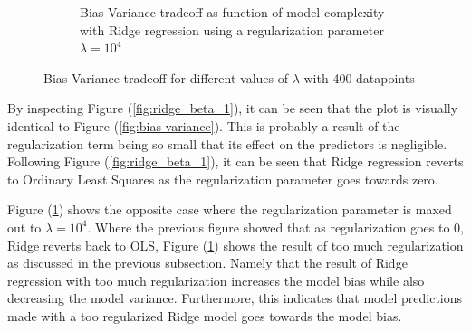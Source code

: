 \documentclass[11pt, a4paper]{article}
\begin{document}
\begin{figure}
\begin{subfigure}{0.49\textwidth}
      \caption{\label{fig:ridge_beta_2}Bias-Variance tradeoff as function of model complexity with Ridge regression using a regularization parameter $\lambda = 10^{4}$}
  \end{subfigure}
  \caption{\label{sfig:ridge_beta_1}Bias-Variance tradeoff for different values of $\lambda$ with 400 datapoints}
\end{figure}

By inspecting Figure (\ref{fig:ridge_beta_1}), it can be seen that the plot is visually identical to Figure (\ref{fig:bias-variance}). This is probably a result of the regularization term being so small that its effect on the predictors is negligible. Following Figure (\ref{fig:ridge_beta_1}), it can be seen that Ridge regression reverts to Ordinary Least Squares as the regularization parameter goes towards zero.

Figure (\ref{fig:ridge_beta_2}) shows the opposite case where the regularization parameter is maxed out to $\lambda = 10^4$. Where the previous figure showed that as regularization goes to 0, Ridge reverts back to OLS, Figure (\ref{fig:ridge_beta_2}) shows the result of too much regularization as discussed in the previous subsection. Namely that the result of Ridge regression with too much regularization increases the model bias while also decreasing the model variance. Furthermore, this indicates that model predictions made with a too regularized Ridge model goes towards the model bias.
\end{document}
